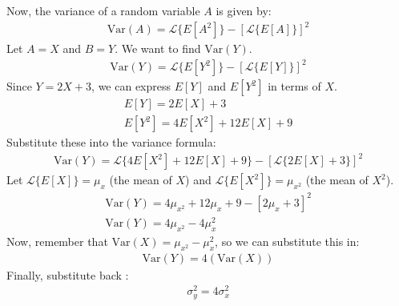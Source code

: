 \documentclass[journal,12pt,onecolumn]{IEEEtran}
\theoremstyle{remark}
\begin{document}
Now, the variance of a random variable $A$ is given by:
\begin{align}
\text{Var}(A) = \mathcal{L}\{E[A^2]\} - [\mathcal{L}\{E[A]\}]^2
\end{align}
Let $A = X$ and $B = Y$. We want to find $\text{Var}(Y)$.
\begin{align}
\text{Var}(Y) = \mathcal{L}\{E[Y^2]\} - [\mathcal{L}\{E[Y]\}]^2
\end{align}
Since $Y = 2X + 3$, we can express $E[Y]$ and $E[Y^2]$ in terms of $X$.
\begin{align}
E[Y] = 2E[X] + 3 \\
E[Y^2] = 4E[X^2] + 12E[X] + 9 
\end{align}
Substitute these into the variance formula:
\begin{align}
\text{Var}(Y) = \mathcal{L}\{4E[X^2] + 12E[X] + 9\} - [\mathcal{L}\{2E[X] + 3\}]^2
\end{align}
Let $\mathcal{L}\{E[X]\} = \mu_x$ (the mean of $X$) and $\mathcal{L}\{E[X^2]\} = \mu_{x^2}$ (the mean of $X^2$).
\begin{align}
\text{Var}(Y) = 4\mu_{x^2} + 12\mu_x + 9 - [2\mu_x + 3]^2 \\
\text{Var}(Y) = 4\mu_{x^2} - 4\mu_x^2 
\end{align}
Now, remember that $\text{Var}(X) = \mu_{x^2} - \mu_x^2$, so we can substitute this in:
\begin{align}
\text{Var}(Y) = 4(\text{Var}(X)) 
\end{align}
Finally, substitute back :
\begin{align}
\sigma_y^2  = 4\sigma_x^2
\end{align}
\end{document}
